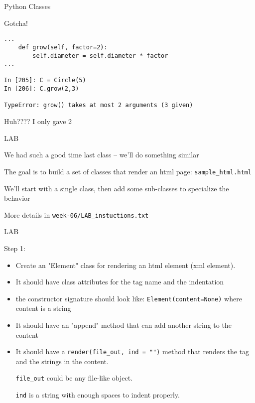\documentclass{beamer}
\begin{document}
\begin{frame}[fragile]{Python Classes}

{\Large Gotcha!}
\begin{verbatim}
...
    def grow(self, factor=2):
        self.diameter = self.diameter * factor
...

In [205]: C = Circle(5)
In [206]: C.grow(2,3)

TypeError: grow() takes at most 2 arguments (3 given)

\end{verbatim}

\vfill
{\LARGE Huh???? I only gave 2} 
\end{frame} 


\begin{frame}[fragile]{LAB}

\vfill
{\Large We had such a good time last class -- we'll do something similar}

\vfill
{\Large The goal is to build a set of classes that render an html page:
\verb|sample_html.html|
}

\vfill
{\Large We'll start with a single class, then add some sub-classes to specialize the behavior}

\vfill
More details in \verb+week-06/LAB_instuctions.txt+
\end{frame}

\begin{frame}[fragile]{LAB}

\vfill
{\Large Step 1:}

\begin{itemize}
  \item Create an "Element" class for rendering an html element (xml element). 
  \item It should have class attributes for the tag name  and the
  indentation
  \item the constructor signature should look like:
    \verb|Element(content=None)| where content is a string
  \item It should have an "append" method that can add another string to the content
  \item It should have a \verb|render(file_out, ind = "")| method that renders the tag
     and the strings in the content.

     \verb|file_out| could be any file-like object.

     \verb|ind| is a string with enough spaces to indent properly.
\end{itemize}

\end{frame}
\end{document}
